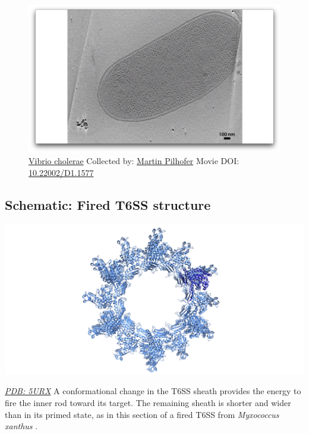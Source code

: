 \documentclass[]{tufte-book}
\begin{document}
\begin{figure}
\includegraphics{movie_stills/9_7} \caption[\protect\hyperlink{tree}{Vibrio cholerae} Collected by:
\protect\hyperlink{martin_pilhofer}{Martin Pilhofer} Movie DOI:
\href{https://doi.org/10.22002/D1.1577}{10.22002/D1.1577}]{\protect\hyperlink{tree}{Vibrio cholerae} Collected by:
\protect\hyperlink{martin_pilhofer}{Martin Pilhofer} Movie DOI:
\href{https://doi.org/10.22002/D1.1577}{10.22002/D1.1577}}\label{fig:9-7}
\end{figure}

\hypertarget{Fired_T6SS_structure}{\subsection*{Schematic: Fired T6SS
structure}\label{Fired_T6SS_structure}}

\includegraphics{img/schematics/9_7_1}

\href{http://rcsb.org/structure/5URX}{\emph{PDB: 5URX}} A conformational
change in the T6SS sheath provides the energy to fire the inner rod
toward its target. The remaining sheath is shorter and wider than in its
primed state, as in this section of a fired T6SS from \emph{Myxococcus
xanthus} \citep{chang2017}.
\end{document}
